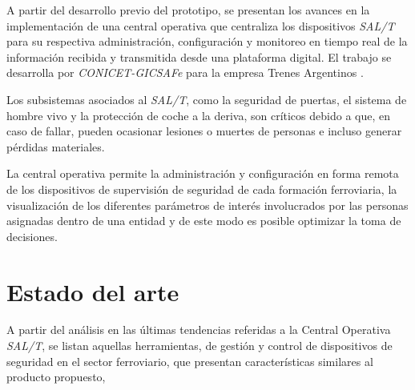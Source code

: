 A partir del desarrollo previo del prototipo, se presentan los avances en la implementación de una central operativa que centraliza los dispositivos \textit{SAL/T} para su respectiva administración, configuración y monitoreo en tiempo real de la información recibida y transmitida desde una plataforma digital. El trabajo se desarrolla por \textit{CONICET-GICSAFe} \citep{gicsafe} para la empresa Trenes Argentinos \citep{trenes-argentinos}.

Los subsistemas asociados al \textit{SAL/T}, como la seguridad de puertas, el sistema de hombre vivo y la protección de coche a la deriva, son críticos debido a que, en caso de fallar, pueden ocasionar lesiones o muertes de personas e incluso generar pérdidas materiales. 

La central operativa permite la administración y configuración en forma remota de los dispositivos de supervisión de seguridad de cada formación ferroviaria, la visualización de los diferentes parámetros de interés involucrados por las personas asignadas dentro de una entidad y de este modo es posible optimizar la toma de decisiones. 


\newpage
\section{Estado del arte}

A partir del análisis en las últimas tendencias referidas a la Central Operativa \textit{SAL/T}, se listan aquellas herramientas, de gestión y control de dispositivos de seguridad en el sector ferroviario, que presentan características similares al producto propuesto,

